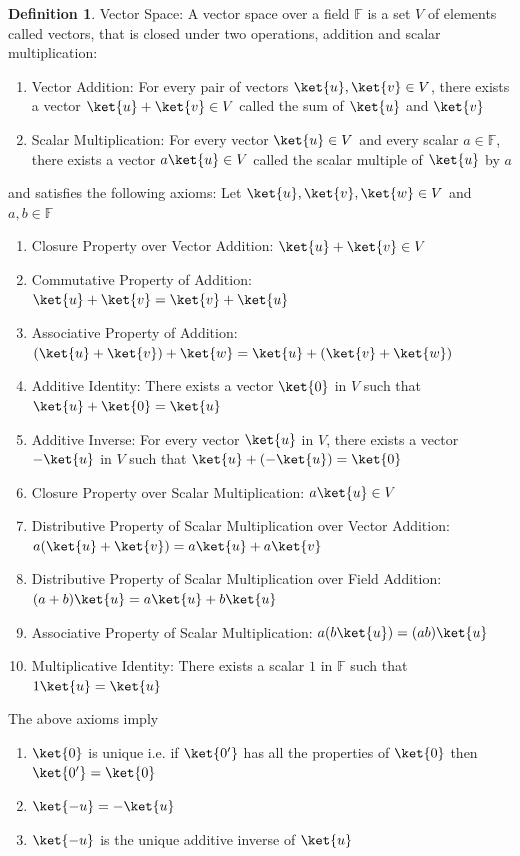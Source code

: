 \documentclass[12pt, oneside]{book}
\theoremstyle{definition}
\newtheorem{definition}{Definition}[section]
\theoremstyle{definition}
\theoremstyle{remark}
\begin{document}
\begin{definition}
    Vector Space: A vector space over a field $\mathbb{F}$ is a set $V$ of elements called vectors, that is closed
    under two operations, addition and scalar multiplication:
    \begin{enumerate}
        \item Vector Addition: For every pair of vectors $\ket{u},\ket{v}\in V$, there exists a vector $\ket{u}+\ket{v}\in V$ called the sum of $\ket{u}$ and $\ket{v}$
        \item Scalar Multiplication: For every vector $\ket{u}\in V$ and every scalar $a\in\mathbb{F}$, there exists a vector $a\ket{u}\in V$ called the scalar multiple of $\ket{u}$ by $a$
    \end{enumerate}
    and satisfies the following axioms:
    Let $\ket{u},\ket{v},\ket{w}\in V$ and $a,b\in\mathbb{F}$
    \label{def:Axioms of Vector Space}
    \begin{enumerate}
        \item Closure Property over Vector Addition: $\ket{u}+\ket{v}\in V$
        \item Commutative Property of Addition: $\ket{u}+\ket{v}=\ket{v}+\ket{u}$
        \item Associative Property of Addition: $(\ket{u}+\ket{v})+\ket{w}=\ket{u}+(\ket{v}+\ket{w})$
        \item Additive Identity: There exists a vector $\ket{0}$ in $V$ such that $\ket{u}+\ket{0}=\ket{u}$
        \item Additive Inverse: For every vector $\ket{u}$ in $V$, there exists a vector $-\ket{u}$ in $V$ such that $\ket{u}+(-\ket{u})=\ket{0}$
        \item Closure Property over Scalar Multiplication: $a\ket{u}\in V$
        \item Distributive Property of Scalar Multiplication over Vector Addition: $a(\ket{u}+\ket{v})=a\ket{u}+a\ket{v}$
        \item Distributive Property of Scalar Multiplication over Field Addition: $(a+b)\ket{u}=a\ket{u}+b\ket{u}$
        \item Associative Property of Scalar Multiplication: $a(b\ket{u})=(ab)\ket{u}$
        \item Multiplicative Identity: There exists a scalar $1$ in $\mathbb{F}$ such that $1\ket{u}=\ket{u}$
    \end{enumerate}
\end{definition}

The above axioms imply
\begin{enumerate}
    \item $\ket{0}$ is unique i.e. if $\ket{0'}$ has all the properties of $\ket{0}$ then $\ket{0'}=\ket{0}$
    \item $\ket{-u}=-\ket{u}$ 
    \item $\ket{-u}$ is the unique additive inverse of $\ket{u}$
\end{enumerate}
\end{document}
